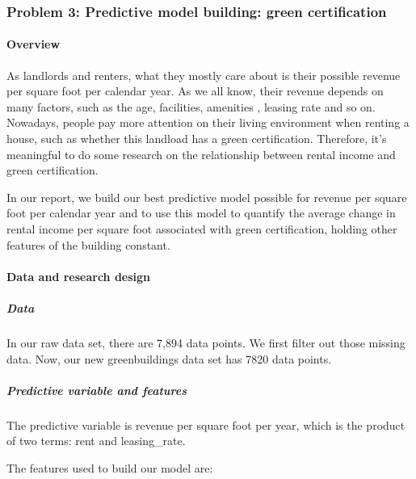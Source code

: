 \documentclass[
]{article}
\begin{document}
\hypertarget{problem-3-predictive-model-building-green-certification}{%
\subsubsection{Problem 3: Predictive model building: green
certification}\label{problem-3-predictive-model-building-green-certification}}

\hypertarget{overview}{%
\paragraph{Overview}\label{overview}}

As landlords and renters, what they mostly care about is their possible
revenue per square foot per calendar year. As we all know, their revenue
depends on many factors, such as the age, facilities, amenities ,
leasing rate and so on. Nowadays, people pay more attention on their
living environment when renting a house, such as whether this landload
has a green certification. Therefore, it's meaningful to do some
research on the relationship between rental income and green
certification.

In our report, we build our best predictive model possible for revenue
per square foot per calendar year and to use this model to quantify the
average change in rental income per square foot associated with green
certification, holding other features of the building constant.

\hypertarget{data-and-research-design}{%
\paragraph{Data and research design}\label{data-and-research-design}}

\hypertarget{data}{%
\subparagraph{Data}\label{data}}

In our raw data set, there are 7,894 data points. We first filter out
those missing data. Now, our new greenbuildings data set has 7820 data
points.

\hypertarget{predictive-variable-and-features}{%
\subparagraph{Predictive variable and
features}\label{predictive-variable-and-features}}

The predictive variable is revenue per square foot per year, which is
the product of two terms: rent and leasing\_rate.

The features used to build our model are:
\end{document}
